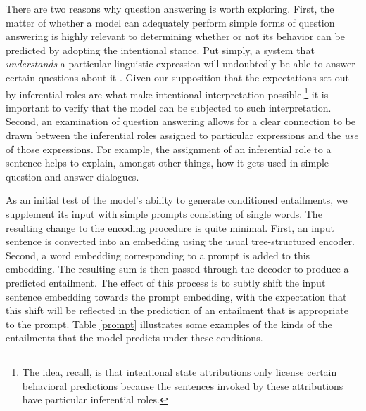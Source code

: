 \documentclass[utf8]{frontiersSCNS} %
\begin{document}
There are two reasons why question answering is worth exploring. First, the matter of whether a model can adequately perform simple forms of question answering is highly relevant to determining whether or not its behavior can be predicted by adopting the intentional stance. Put simply, a system that \textit{understands} a particular linguistic expression will undoubtedly be able to answer certain questions about it \citep{StJohn:1990,Rabovsky:2017}. Given our supposition that the expectations set out by inferential roles are what make intentional interpretation possible,\footnote{The idea, recall, is that intentional state attributions only license certain behavioral predictions because the sentences invoked by these attributions have particular inferential roles.} it is important to verify that the model can be subjected to such interpretation. Second, an examination of question answering allows for a clear connection to be drawn between the inferential roles assigned to particular expressions and the \textit{use} of those expressions. For example, the assignment of an inferential role to a sentence helps to explain, amongst other things, how it gets used in simple question-and-answer dialogues.

As an initial test of the model's ability to generate conditioned entailments, we supplement its input with simple prompts consisting of single words. The resulting change to the encoding procedure is quite minimal. First, an input sentence is converted into an embedding using the usual tree-structured encoder. Second, a word embedding corresponding to a prompt is added to this embedding. The resulting sum is then passed through the decoder to produce a predicted entailment. The effect of this process is to subtly shift the input sentence embedding towards the prompt embedding, with the expectation that this shift will be reflected in the prediction of an entailment that is appropriate to the prompt. Table \ref{prompt} illustrates some examples of the kinds of the entailments that the model predicts under these conditions.  
\end{document}
